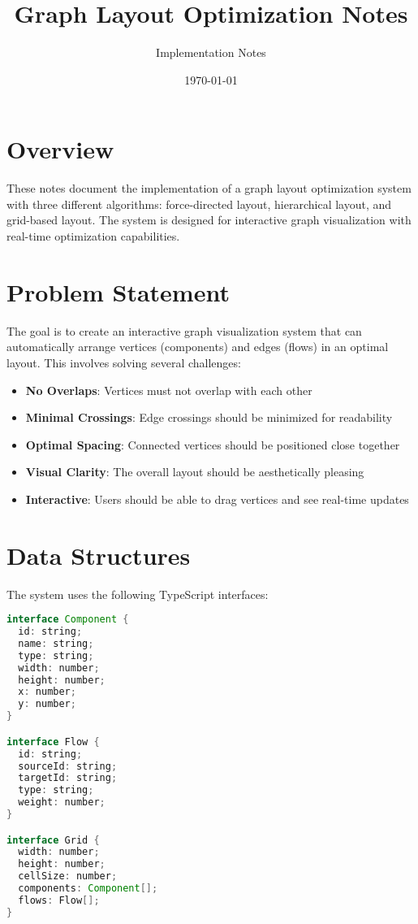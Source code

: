 \documentclass[11pt]{article}
\title{Graph Layout Optimization Notes}
\author{Implementation Notes}
\date{\today}
\begin{document}
\maketitle

\section*{Overview}
These notes document the implementation of a graph layout optimization system with three different algorithms: force-directed layout, hierarchical layout, and grid-based layout. The system is designed for interactive graph visualization with real-time optimization capabilities.

\section{Problem Statement}

The goal is to create an interactive graph visualization system that can automatically arrange vertices (components) and edges (flows) in an optimal layout. This involves solving several challenges:

\begin{itemize}
\item \textbf{No Overlaps}: Vertices must not overlap with each other
\item \textbf{Minimal Crossings}: Edge crossings should be minimized for readability
\item \textbf{Optimal Spacing}: Connected vertices should be positioned close together
\item \textbf{Visual Clarity}: The overall layout should be aesthetically pleasing
\item \textbf{Interactive}: Users should be able to drag vertices and see real-time updates
\end{itemize}

\section{Data Structures}

The system uses the following TypeScript interfaces:

\begin{lstlisting}[language=Java, caption=Core Data Structures]
interface Component {
  id: string;
  name: string;
  type: string;
  width: number;
  height: number;
  x: number;
  y: number;
}

interface Flow {
  id: string;
  sourceId: string;
  targetId: string;
  type: string;
  weight: number;
}

interface Grid {
  width: number;
  height: number;
  cellSize: number;
  components: Component[];
  flows: Flow[];
}
\end{lstlisting}
\end{document}
